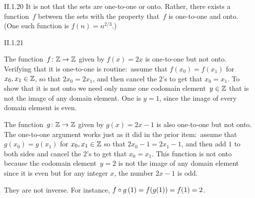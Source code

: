 %
\begin{ans}{II.1.20}
It is not that the sets are one-to-one or onto.
Rather, there exists a function~$f$ between the sets with the property that~$f$
is one-to-one and onto.
(One such function is $f(n)= n^{2/3}$.)
\end{ans}
%
\begin{ans}{II.1.21}
\begin{exparts}
\item The function~$\mbox{$f\colon \mathbb{Z}\to \mathbb{Z}$}$ given by $f(x) = 2x$ is one-to-one
  but not onto.
  Verifying that it is one-to-one is routine:~assume that $f(x_0)=f(x_1)$
  for $x_0,x_1\in\mathbb{Z}$, so that $2x_0=2x_1$, and then cancel the $2$'s to
  get that $x_0=x_1$.
  To show that it is not onto we need only name one codomain element~$y\in\mathbb{Z}$
  that is not the image of any domain element.
  One is $y=1$, since the image of every domain element is even.
\item The function~$\mbox{$g\colon \mathbb{Z}\to \mathbb{Z}$}$ given by $g(x) = 2x-1$ is also one-to-one
  but not onto.
  The one-to-one argument works just as it did in the prior
  item:~assume that $g(x_0)=g(x_1)$
  for $x_0,x_1\in\mathbb{Z}$ so that $2x_0-1=2x_1-1$, and then add $1$ to both sides
  and cancel the $2$'s to get that $x_0=x_1$.
  This function is not onto because the codomain element~$y=2$
  is not the image of any domain element since it is even but
  for any integer $x$, the number $2x-1$ is odd.
\item They are not inverse.
  For instance, $\mathord{f\mathbin{\circ} g}\,(1)=f(g(1))=f(1)=2$.
\end{exparts}
\end{ans}
%
